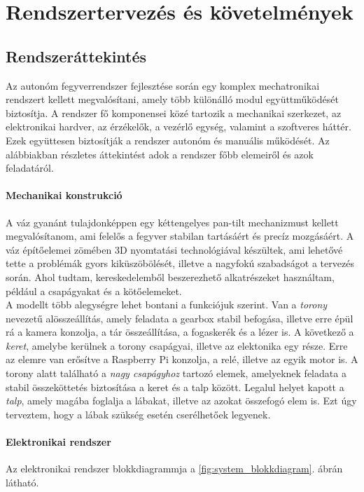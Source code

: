 \chapter{Rendszertervezés és követelmények}

\section{Rendszeráttekintés}
Az autonóm fegyverrendszer fejlesztése során egy komplex mechatronikai rendszert kellett megvalósítani, amely több különálló modul együttműködését biztosítja. A rendszer fő komponensei közé tartozik a mechanikai szerkezet, az elektronikai hardver, az érzékelők, a vezérlő egység, valamint a szoftveres háttér. Ezek együttesen biztosítják a rendszer autonóm és manuális működését. Az alábbiakban részletes áttekintést adok a rendszer főbb elemeiről és azok feladatáról.

\subsubsection*{Mechanikai konstrukció}

A váz gyanánt tulajdonképpen egy kéttengelyes pan-tilt mechanizmust kellett megvalósítanom, ami felelős a fegyver stabilan tartásáért és precíz mozgásáért. A váz építőelemei zömében 3D nyomtatási technológiával készültek, ami lehetővé tette a problémák gyors kiküszöbölését, illetve a nagyfokú szabadságot a tervezés során. Ahol tudtam, kereskedelemből beszerezhető alkatrészeket használtam, például a csapágyakat és a kötőelemeket.\\

A modellt több alegységre lehet bontani a funkciójuk szerint. Van a \textsl{torony} nevezetű alösszeállítás, amely feladata a gearbox stabil befogása, illetve erre épül rá a kamera konzolja, a tár összeállítása, a fogaskerék és a lézer is. A következő a \textsl{keret}, amelybe kerülnek a torony csapágyai, illetve az elektonika egy része. Erre az elemre van erősítve a Raspberry Pi konzolja, a relé, illetve az egyik motor is. A torony alatt található a \textsl{nagy csapágyhoz }tartozó elemek, amelyeknek feladata a stabil összeköttetés biztosítása a keret és a talp között. Legalul helyet kapott a \textsl{talp}, amely magába foglalja a lábakat, illetve az azokat összefogó elem is. Ezt úgy terveztem, hogy a lábak szükség esetén cserélhetőek legyenek.

\pagebreak
\subsubsection*{Elektronikai rendszer}
Az elektronikai rendszer blokkdiagrammja a \ref{fig:system_blokkdiagram}. ábrán látható.\\

